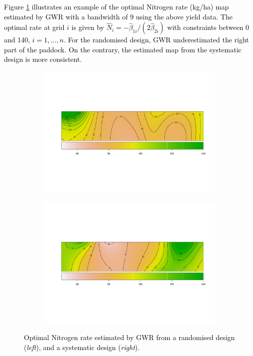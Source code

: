 \documentclass[a4paper]{article} 	%
\newcommand{\zc}[1]{\textcolor{black}{#1}}
\begin{document}
\zc{Figure \ref{fig:optNmap} illustrates an example of the optimal Nitrogen rate (kg/ha) map estimated by GWR with a bandwidth of 9 using the above yield data. The optimal rate at grid $i$ is given by $\hat{N}_i = -\hat{\beta}_{1i}/(2\hat{\beta}_{2i})$ with constraints between 0 and 140, $i=1,\ldots,n$. For the randomised design, GWR underestimated the right part of the paddock. On the contrary, the estimated map from the systematic design is more consistent.}

\begin{figure}[!htp]
	\begin{subfigure}[t]{0.45\textwidth}
		\centering
		\includegraphics[width=\linewidth]{optN_rand_matB9.pdf}
 \end{subfigure}
	\hspace{0.05\textwidth}
	\begin{subfigure}[t]{0.45\textwidth}
		\centering
		\includegraphics[width=\linewidth]{optN_syst_matB9.pdf}
 \end{subfigure}
	\caption{\zc{Optimal Nitrogen rate estimated by GWR from a randomised design (\textit{left}), and a systematic design (\textit{right}).}}\label{fig:optNmap}
\end{figure}
\end{document}
